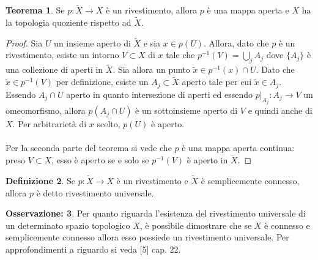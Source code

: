 \documentclass[12pt,a4paper]{report}
\theoremstyle{definition}
\newtheorem{Def}{Definizione}[chapter]
\theoremstyle{Theorem}
\newtheorem{Theo}[Def]{Teorema}
\theoremstyle{definition}
\theoremstyle{definition}
\theoremstyle{definition}
\newtheorem{Obs}[Def]{Osservazione:}
\begin{document}
\begin{center}
	
\end{center}
\begin{Theo}
	Se $p:\tilde{X}\rightarrow X$ è un rivestimento, allora $p$ è una mappa aperta e $X$ ha la topologia quoziente rispetto ad $\tilde{X}$.
\end{Theo}
\begin{proof}
	Sia $U$
 un insieme aperto di $\tilde{X}$ e sia $x\in p(U)$. Allora, dato che $p$ è un rivestimento, esiste un intorno $V\subset X$ di $x$ tale che $p^{-1}(V)=\bigcup_jA_j$ dove $\{A_j\}$ è una collezione di aperti in $\tilde{X}$. Sia allora un punto $\tilde{x}\in p^{-1}(x)\cap U$. Dato che $\tilde{x}\in p^{-1}(V)$ per definizione, esiste un $A_j\subset \tilde{X}$ aperto tale per cui $\tilde{x}\in A_j$. Essendo $A_j\cap U$ aperto in quanto intersezione di aperti ed essendo $p|_{A_j}:A_j\rightarrow V$ un omeomorfismo, allora $p(A_j\cap U)$ è un sottoinsieme aperto di $V$ e quindi anche di $X$. Per arbitrarietà di $x$ scelto, $p(U)$ è aperto.\\
 \\
 Per la seconda parte del teorema si vede che $p$ è una mappa aperta continua: preso $V\subset X$, esso è aperto se e solo se $p^{-1}(V)$ è aperto in $\tilde{X}$.  
\end{proof}
\begin{Def} \label{Def:2.2.1}
	Se $p:\tilde{X}\rightarrow X$ è un rivestimento e $\tilde{X}$ è semplicemente connesso, allora $p$ è detto rivestimento universale.
\end{Def}
\begin{Obs}
	Per quanto riguarda l'esistenza del rivestimento universale di un determinato spazio topologico $X$, è possibile dimostrare che se $X$ è connesso e semplicemente connesso allora esso possiede un rivestimento universale. Per approfondimenti a riguardo si veda [5] cap. 22.
\end{Obs}
\end{document}

